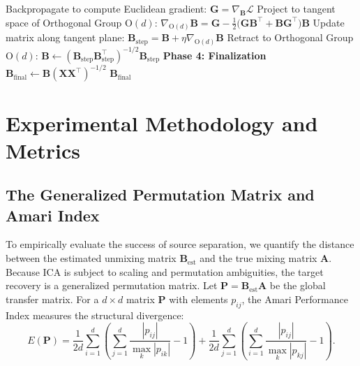 \documentclass[accepted]{tpm2026} %
\begin{document}
\begin{algorithm}[htbp]
\begin{algorithmic}[1]
    \State Backpropagate to compute Euclidean gradient: $\mathbf{G} = \nabla_{\mathbf{B}} \mathcal{L}$
    \State Project to tangent space of Orthogonal Group $\mathrm{O}(d)$: $\nabla_{\mathrm{O}(d)} \mathbf{B} = \mathbf{G} - \frac{1}{2}\big(\mathbf{G}\mathbf{B}^\top + \mathbf{B}\mathbf{G}^\top \big)\mathbf{B}$
    \State Update matrix along tangent plane: $\mathbf{B}_{\text{step}} = \mathbf{B} + \eta \nabla_{\mathrm{O}(d)} \mathbf{B}$
    \State Retract to Orthogonal Group $\mathrm{O}(d)$: $\mathbf{B} \gets (\mathbf{B}_{\text{step}}\mathbf{B}_{\text{step}}^\top)^{-1/2} \mathbf{B}_{\text{step}}$
\EndFor
\State \textbf{Phase 4: Finalization}
\State $\mathbf{B}_{\text{final}} \gets \mathbf{B} (\mathbf{X}\mathbf{X}^\top)^{-1/2}$ 
\State \Return $\mathbf{B}_{\text{final}}$
\end{algorithmic}
\end{algorithm}

\section{Experimental Methodology and Metrics}
\label{app:experimental_setup}

\subsection{The Generalized Permutation Matrix and Amari Index}
To empirically evaluate the success of source separation, we quantify the distance between the estimated unmixing matrix $\mathbf{B}_{\text{est}}$ and 
the true mixing matrix $\mathbf{A}$. Because ICA is subject to scaling and permutation ambiguities, the target recovery is a generalized permutation matrix. 
Let $\mathbf{P} = \mathbf{B}_{\text{est}} \mathbf{A}$ be the global transfer matrix. For a $d \times d$ matrix $\mathbf{P}$ with elements $p_{ij}$, 
the Amari Performance Index \citep{amari1996new} measures the structural divergence:
\begin{equation}
    E(\mathbf{P}) = \frac{1}{2d} \sum_{i=1}^d \left( \sum_{j=1}^d \frac{|p_{ij}|}{\max_k |p_{ik}|} - 1 \right) + \frac{1}{2d} \sum_{j=1}^d \left( \sum_{i=1}^d \frac{|p_{ij}|}{\max_k |p_{kj}|} - 1 \right).
\end{equation}
\end{document}
